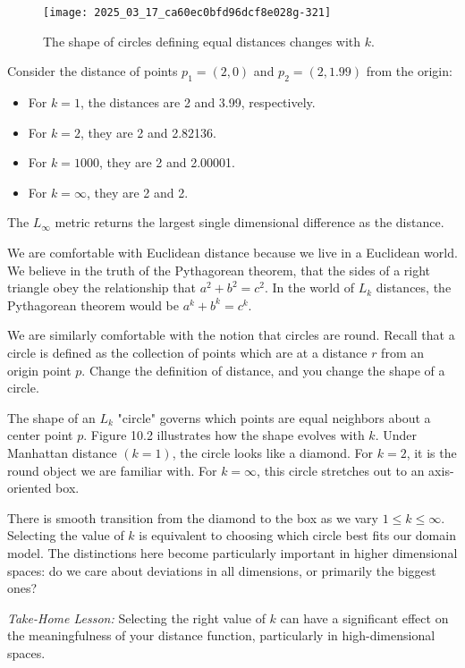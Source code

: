 \documentclass[10pt]{article}
\begin{document}
\begin{figure}[ht]
    \centering
    \texttt{[image: 2025\_03\_17\_ca60ec0bfd96dcf8e028g-321]}
    \caption{The shape of circles defining equal distances changes with $k$.}
\end{figure}

Consider the distance of points $p_{1}=(2,0)$ and $p_{2}=(2,1.99)$ from the origin:
\begin{itemize}
    \item For $k=1$, the distances are 2 and 3.99, respectively.
    \item For $k=2$, they are 2 and 2.82136.
    \item For $k=1000$, they are 2 and 2.00001.
    \item For $k=\infty$, they are 2 and 2.
\end{itemize}

The $L_{\infty}$ metric returns the largest single dimensional difference as the distance.

We are comfortable with Euclidean distance because we live in a Euclidean world. We believe in the truth of the Pythagorean theorem, that the sides of a right triangle obey the relationship that $a^{2}+b^{2}=c^{2}$. In the world of $L_k$ distances, the Pythagorean theorem would be $a^{k}+b^{k}=c^{k}$.

We are similarly comfortable with the notion that circles are round. Recall that a circle is defined as the collection of points which are at a distance $r$ from an origin point $p$. Change the definition of distance, and you change the shape of a circle.

The shape of an $L_k$ "circle" governs which points are equal neighbors about a center point $p$. Figure 10.2 illustrates how the shape evolves with $k$. Under Manhattan distance $(k=1)$, the circle looks like a diamond. For $k=2$, it is the round object we are familiar with. For $k=\infty$, this circle stretches out to an axis-oriented box.

There is smooth transition from the diamond to the box as we vary $1 \leq k \leq \infty$. Selecting the value of $k$ is equivalent to choosing which circle best fits our domain model. The distinctions here become particularly important in higher dimensional spaces: do we care about deviations in all dimensions, or primarily the biggest ones?

\textit{Take-Home Lesson:} Selecting the right value of $k$ can have a significant effect on the meaningfulness of your distance function, particularly in high-dimensional spaces.
\end{document}
